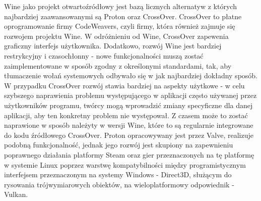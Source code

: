 Wine jako projekt otwartoźródłowy jest bazą licznych alternatyw\cite{wineBasedProjects} z których najbardziej zaawansowanymi są Proton\cite{proton} oraz CrossOver\cite{crossover}. CrossOver to płatne oprogramowanie firmy CodeWeavers, czyli firmy, która również zajmuje się rozwojem projektu Wine. W odróżnieniu od Wine, CrossOver zapewenia graficzny interfejs użytkownika. Dodatkowo, rozwój Wine jest bardziej restrykcyjny i czasochłonny - nowe funkcjonalności muszą zostać zaimplementowane w sposób zgodny z określonymi standardami, tak, aby tłumaczenie wołań systemowych odbywało się w jak najbardziej dokładny sposób. W przypadku CrossOver rozwój stawia bardziej na aspekty użytkowe - w celu szybszego naprawienia problemu występującego w aplikacji często używanej przez użytkowników programu, twórcy mogą wprowadzić zmiany specyficzne dla danej aplikacji, aby ten konkretny problem nie występował. Z czasem może to zostać naprawione w sposób należyty w wersji Wine, które to są regularnie integrowane do kodu źródłowego CrossOver. Proton opracowywany jest przez Valve, realizuje podobną funkcjonalność, jednak jego rozwój jest skupiony na zapewnieniu poprawnego działania platformy Steam oraz gier przeznaczonych na tę platformę w systemie Linux poprzez warstwę kompatybilności między programistycznym interfejsem przeznaczonym na systemy Windows - Direct3D, służącym do rysowania trójwymiarowych obiektów, na wieloplatformowy odpowiednik - Vulkan.


